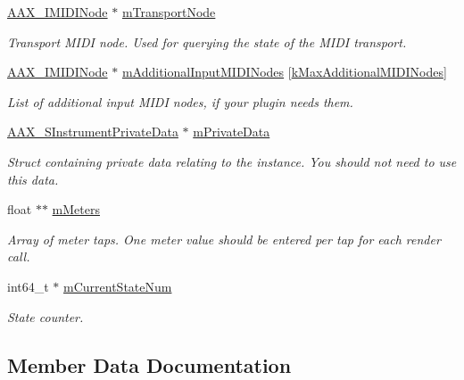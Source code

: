 \begin{DoxyCompactItemize}
\hyperlink{a00105}{A\+A\+X\+\_\+\+I\+M\+I\+D\+I\+Node} $\ast$ \hyperlink{a00123_a60ea39a008cad2ecd97b2251787b3b38}{m\+Transport\+Node}
\begin{DoxyCompactList}\small\item\em Transport M\+I\+D\+I node. Used for querying the state of the M\+I\+D\+I transport. \end{DoxyCompactList}\item 
\hyperlink{a00105}{A\+A\+X\+\_\+\+I\+M\+I\+D\+I\+Node} $\ast$ \hyperlink{a00123_ab90074855c83148226feb8a64ac0b354}{m\+Additional\+Input\+M\+I\+D\+I\+Nodes} \mbox{[}\hyperlink{a00178_af66ae5854aedf3b38c6d6540670966b1}{k\+Max\+Additional\+M\+I\+D\+I\+Nodes}\mbox{]}
\begin{DoxyCompactList}\small\item\em List of additional input M\+I\+D\+I nodes, if your plugin needs them. \end{DoxyCompactList}\item 
\hyperlink{a00122}{A\+A\+X\+\_\+\+S\+Instrument\+Private\+Data} $\ast$ \hyperlink{a00123_aff00dfa131d966478ab571ebcab7a86c}{m\+Private\+Data}
\begin{DoxyCompactList}\small\item\em Struct containing private data relating to the instance. You should not need to use this data. \end{DoxyCompactList}\item 
float $\ast$$\ast$ \hyperlink{a00123_a68ae865355f50537127d3e2e0efd585f}{m\+Meters}
\begin{DoxyCompactList}\small\item\em Array of meter taps. One meter value should be entered per tap for each render call. \end{DoxyCompactList}\item 
int64\+\_\+t $\ast$ \hyperlink{a00123_a846c5f9e518bb66bf1854a9eb77d54a7}{m\+Current\+State\+Num}
\begin{DoxyCompactList}\small\item\em State counter. \end{DoxyCompactList}\end{DoxyCompactItemize}


\subsection{Member Data Documentation}
\hypertarget{a00123_a84a9670391f6c3ade12f8577e3c127a7}{}
